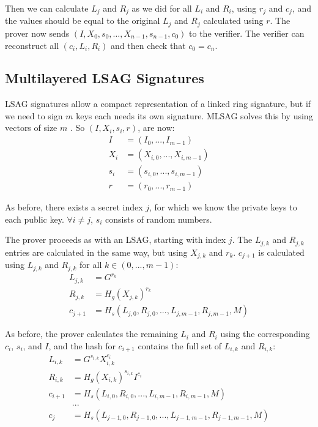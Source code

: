\documentclass{article}
\begin{document}
Then we can calculate $L_j$ and $R_j$ as we did for all $L_i$ and $R_i$, using $r_j$ and $c_j$, and the values should be equal to the original $L_j$ and $R_j$ calculated using $r$. The prover now sends $(I, X_0, s_0, …, X_{n-1}, s_{n-1}, c_0)$ to the verifier.  The verifier can reconstruct all $(c_i, L_i, R_i)$ and then check that $c_0 = c_n$.


\subsection{Multilayered LSAG Signatures}

LSAG signatures allow a compact representation of a linked ring signature, but if we need to sign $m$ keys each needs its own signature. MLSAG solves this by using vectors of size $m$ \cite{ringct}.  So $(I, X_i, s_i, r)$, are now:
\begin{align}
  I &= (I_{0}, ..., I_{m-1})\nonumber\\
  X_i &= (X_{i,0}, ..., X_{i,m-1})\nonumber\\
  s_i &= (s_{i,0}, ..., s_{i,m-1})\nonumber\\
  r &= (r_{0}, ..., r_{m-1})\nonumber
\end{align}

As before, there exists a secret index $j$, for which we know the private keys to each public key. $\forall i \ne j$, $s_i$ consists of random numbers.

The prover proceeds as with an LSAG, starting with index $j$.  The $L_{j,k}$ and $R_{j,k}$ entries are calculated in the same way, but using $X_{j,k}$ and $r_k$.  $c_{j+1}$ is calculated using $L_{j,k}$ and $R_{j,k}$ for all $k \in (0, ..., m-1)$:
\begin{align}
  L_{j,k} &= G^{r_k}\\
  R_{j,k} &= H_g(X_{j,k})^{r_k}\\
  c_{j+1} &= H_s(L_{j,0}, R_{j,0}, ..., L_{j,m-1}, R_{j,m-1}, M)
\end{align}

As before, the prover calculates the remaining $L_i$ and $R_i$ using the corresponding $c_i$, $s_i$, and $I$, and the hash for $c_{i+1}$ contains the full set of $L_{i,k}$ and $R_{i,k}$:
\begin{align}
  L_{i,k} &= G^{s_{i,k}} X_{i,k}^{c_i}\\
  R_{i,k} &= H_g(X_{i,k})^{s_{i,k}} I^{c_i}\\
  c_{i+1} &= H_s(L_{i,0}, R_{i,0}, ..., L_{i,m-1}, R_{i,m-1}, M) \\
  &... \\
  c_j &= H_s(L_{j-1,0}, R_{j-1,0}, ..., L_{j-1,m-1}, R_{j-1,m-1}, M) 
\end{align}
\end{document}
